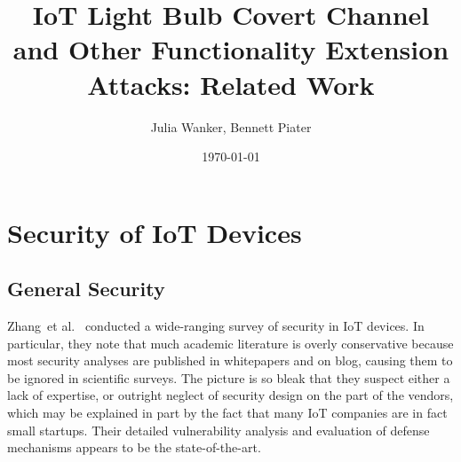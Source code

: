 \documentclass[11pt,a4paper]{article}
\begin{document}
	\title{IoT Light Bulb Covert Channel and Other Functionality Extension Attacks: Related Work}
	\author{Julia Wanker, Bennett Piater}
	\date{\today}
	\maketitle

	\section{Security of IoT Devices}%
	\label{sec:security_of_iot_devices}

	\subsection{General Security}%
	\label{sub:general_security}

	\cite{Restuccia:2018:SITNPaRC} %

  Zhang~et al.~\cite{Zhang:2017:UISTDCBWWNaWWG} %
	conducted a wide-ranging survey of security in IoT devices.
	In particular, they note that much academic literature is overly conservative because most security analyses are published in whitepapers and on blog, causing them to be ignored in scientific surveys.
	The picture is so bleak that they suspect either a lack of expertise, or outright neglect of security design on the part of the vendors, which may be explained in part by the fact that many IoT companies are in fact small startups.
	Their detailed vulnerability analysis and evaluation of defense mechanisms appears to be the state-of-the-art.
\end{document}
